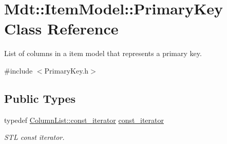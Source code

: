 \hypertarget{class_mdt_1_1_item_model_1_1_primary_key}{}\section{Mdt\+:\+:Item\+Model\+:\+:Primary\+Key Class Reference}
\label{class_mdt_1_1_item_model_1_1_primary_key}


List of columns in a item model that represents a primary key.  




{\ttfamily \#include $<$Primary\+Key.\+h$>$}

\subsection*{Public Types}
\begin{DoxyCompactItemize}
\item 
typedef \hyperlink{class_mdt_1_1_item_model_1_1_row_column_list_base_ab6fc8d06705e4434201915f0c9860721}{Column\+List\+::const\+\_\+iterator} \hyperlink{class_mdt_1_1_item_model_1_1_primary_key_a3cc914eff5c2dacc013ede2faa00b5f5}{const\+\_\+iterator}\hypertarget{class_mdt_1_1_item_model_1_1_primary_key_a3cc914eff5c2dacc013ede2faa00b5f5}{}\label{class_mdt_1_1_item_model_1_1_primary_key_a3cc914eff5c2dacc013ede2faa00b5f5}

\begin{DoxyCompactList}\small\item\em S\+TL const iterator. \end{DoxyCompactList}\end{DoxyCompactItemize}
